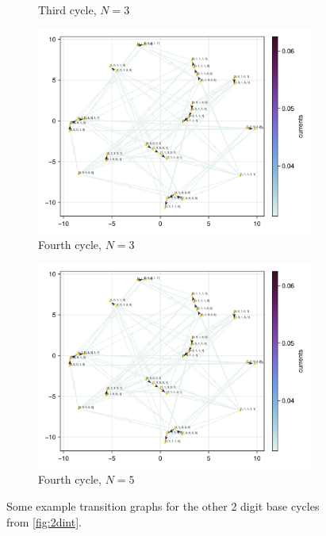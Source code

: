 \documentclass[11pt]{article}
\begin{document}
\begin{figure}[H]
\begin{subfigure}[t]{0.49\textwidth}
        \caption{Third cycle, $N=3$}
    \end{subfigure}
    \begin{subfigure}[t]{0.49\textwidth}
        \includegraphics[width=\textwidth]{../../plots/ones/c4/spring_N=5_metadata=(chash=2008083833646787391,ctype=simple).png}
        \centering
        \caption{Fourth cycle, $N=3$}
    \end{subfigure}
    \begin{subfigure}[t]{0.49\textwidth}
        \centering
        \includegraphics[width=\textwidth]{../../plots/ones/c4/spring_N=5_metadata=(chash=2008083833646787391,ctype=simple).png}
        \caption{Fourth cycle, $N=5$}
    \end{subfigure}
    \caption{
        Some example transition graphs for the other 2 digit base cycles from \cref{fig:2dint}.
    }\label{fig:2dothers}
\end{figure}
\end{document}
